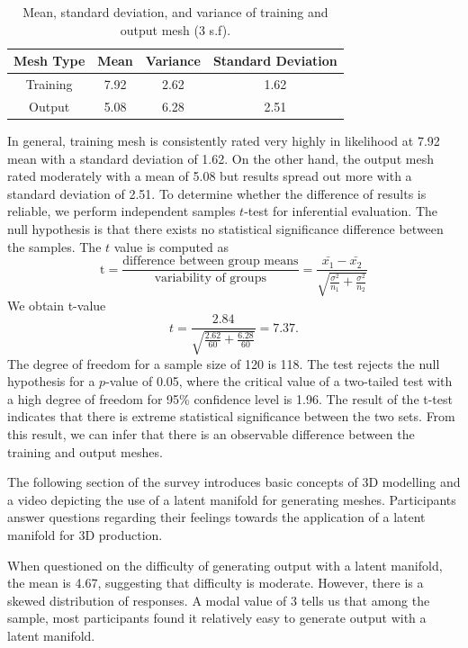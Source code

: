 \documentclass[ %
author={Dillon Keith Diep},
supervisor={Dr. Carl Henrik Ek},
degree={MEng},
title={ART-CG Hair:},
subtitle={Assisted Real-time Content Generation of Stylised Virtual Hair},
type={Research},
year={2017} ]{dissertation}
\begin{document}
\begin{table}[!h]
	\centering
	\begin{tabular}{|c|c|c|c|}
		\hline
		Mesh Type   & Mean      & Variance  & Standard Deviation\\
		\hline
		Training    & 7.92      & 2.62      & 1.62\\
		\hline
		Output      & 5.08      & 6.28      & 2.51\\
		\hline
	\end{tabular}
	\caption{Mean, standard deviation, and variance of training and output mesh (3 s.f).}
\end{table}

In general, training mesh is consistently rated very highly in likelihood at 7.92 mean with a standard deviation of 1.62. On the other hand, the output mesh rated moderately with a mean of 5.08 but results spread out more with a standard deviation of 2.51. To determine whether the difference of results is reliable, we perform independent samples $t$-test for inferential evaluation. The null hypothesis is that there exists no statistical significance difference between the samples. The $t$ value is computed as
$$\text{t}=\frac{\text{difference between group means}}{\text{variability of groups}}=\frac{\bar{x_1}-\bar{x_2}}{\sqrt{\frac{\sigma^2}{n_1}+\frac{\sigma^2}{n_2}}}$$
We obtain t-value
$$t = \frac{2.84}{\sqrt{\frac{2.62}{60}+\frac{6.28}{60}}}=7.37.$$
The degree of freedom for a sample size of 120 is 118. The test rejects the null hypothesis for a $p$-value of 0.05, where the critical value of a two-tailed test with a high degree of freedom for 95\% confidence level is 1.96. The result of the t-test indicates that there is extreme statistical significance between the two sets. From this result, we can infer that there is an observable difference between the training and output meshes.

The following section of the survey introduces basic concepts of 3D modelling and a video depicting the use of a latent manifold for generating meshes. Participants answer questions regarding their feelings towards the application of a latent manifold for 3D production.

When questioned on the difficulty of generating output with a latent manifold, the mean is 4.67, suggesting that difficulty is moderate. However, there is a skewed distribution of responses. A modal value of 3 tells us that among the sample, most participants found it relatively easy to generate output with a latent manifold.
\end{document}
